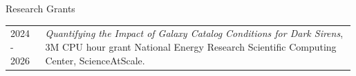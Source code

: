\begin{rSection}{Research Grants}
\setlength{\extrarowheight}{3pt}
\begin{longtable}{p{0.1\linewidth}p{0.89\linewidth}}
    2024 - 2026 & \textit{Quantifying the Impact of Galaxy Catalog Conditions for Dark Sirens}, 3M CPU hour grant National Energy Research Scientific Computing Center, ScienceAtScale.
\end{longtable}
\end{rSection}
